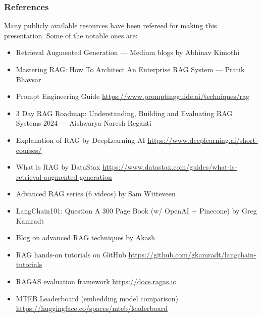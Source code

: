 \begin{frame}\frametitle{References}
Many publicly available resources have been refereed for making this presentation. Some of the notable ones are:
\footnotesize
\begin{itemize}
\item Retrieval Augmented Generation --- Medium blogs by Abhinav Kimothi
\item Mastering RAG: How To Architect An Enterprise RAG System --- Pratik Bhavsar
\item Prompt Engineering Guide \url{https://www.promptingguide.ai/techniques/rag}
\item 3 Day RAG Roadmap: Understanding, Building and Evaluating RAG Systems 2024 --- Aishwarya Naresh Reganti
\item Explanation of RAG by DeepLearning AI \url{https://www.deeplearning.ai/short-courses/}
\item What is RAG by DataStax \url{https://www.datastax.com/guides/what-is-retrieval-augmented-generation}
\item Advanced RAG series (6 videos) by Sam Witteveen
\item LangChain101: Question A 300 Page Book (w/ OpenAI + Pinecone) by Greg Kamradt
\item Blog on advanced RAG techniques by Akash
\item RAG hands-on tutorials on GitHub \url{https://github.com/gkamradt/langchain-tutorials}
\item RAGAS evaluation framework \url{https://docs.ragas.io}
\item MTEB Leaderboard (embedding model comparison) \url{https://huggingface.co/spaces/mteb/leaderboard}
\end{itemize}

\end{frame}
